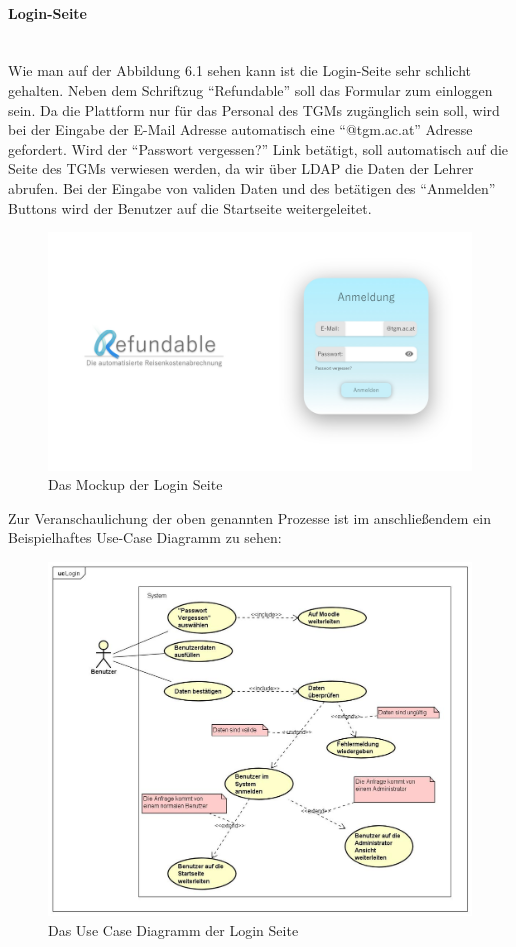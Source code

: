 \paragraph{Login-Seite}
~\\
Wie man auf der Abbildung 6.1 sehen kann ist die Login-Seite sehr schlicht gehalten. Neben dem Schriftzug \enquote{Refundable} soll das Formular zum einloggen sein. Da die Plattform nur für das Personal des TGMs zugänglich sein soll, wird bei der Eingabe der E-Mail Adresse automatisch eine \enquote{@tgm.ac.at} Adresse gefordert. Wird der \enquote{Passwort vergessen?} Link betätigt, soll automatisch auf die Seite des TGMs verwiesen werden, da wir über LDAP die Daten der Lehrer abrufen. Bei der Eingabe von validen Daten und des betätigen des \enquote{Anmelden} Buttons wird der Benutzer auf die Startseite weitergeleitet.
\begin{figure}[H]
	\centering
	\includegraphics[width=1\linewidth]{images/Mockup-Startseite}
	\caption[Mockup Login]{Das Mockup der Login Seite}
	\label{fig:mockupLogin}
\end{figure}
Zur Veranschaulichung der oben genannten Prozesse ist im anschließendem ein Beispielhaftes Use-Case Diagramm zu sehen: 
\begin{figure}[H]
	\centering
	\includegraphics[width=1\linewidth]{images/uc-login}
	\caption[Use Case Diagramm Login]{Das Use Case Diagramm der Login Seite}
	\label{fig:ucLogin}
\end{figure}
\newpage
